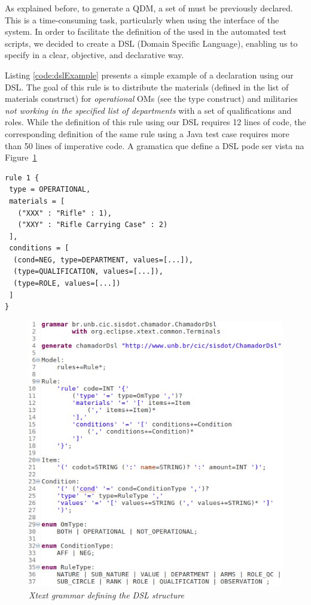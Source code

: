 As explained before, to generate a QDM, a set of \callers must be previously 
declared. This is a time-consuming task, particularly when using the interface of 
the system. In order to facilitate the definition of the \callers used in the automated test scripts, we 
decided to create a DSL (Domain Specific Language), enabling us to specify \callers in a 
clear, objective, and declarative way. 

Listing \ref{code:dslExample} presents a simple example of a \shc declaration using our DSL. 
The goal of this rule is to distribute 
the materials (defined in the list of materials construct) for \emph{operational} OMs (see the 
type construct) and militaries \emph{not working in the specified list of 
departments} with a set of qualifications and roles. While the definition of this rule 
using our DSL requires 12 lines of code, the corresponding definition of the same rule 
using a Java test case requires more than 50 lines of imperative code. {\color{red}A gramatica que define a DSL pode ser vista na} Figure~\ref{fig:gramatica}

\begin{small}
\begin{lstlisting}[frame=single, caption={Example of a \shc declaration using our DSL}, label={code:dslExample}]
rule 1 { 
 type = OPERATIONAL, 
 materials = [ 
   ("XXX" : "Rifle" : 1), 
   ("XXY" : "Rifle Carrying Case" : 2)
 ], 
 conditions = [ 
  (cond=NEG, type=DEPARTMENT, values=[...]),
  (type=QUALIFICATION, values=[...]), 
  (type=ROLE, values=[...])
 ]
}
\end{lstlisting}
\end{small}

\begin{figure}[!ht] \centering
	\includegraphics[width=.47\textwidth]{img/artigo_gramatica.jpg}
	\caption{\it Xtext grammar defining the DSL structure} 
	\label{fig:gramatica}
\end{figure}

